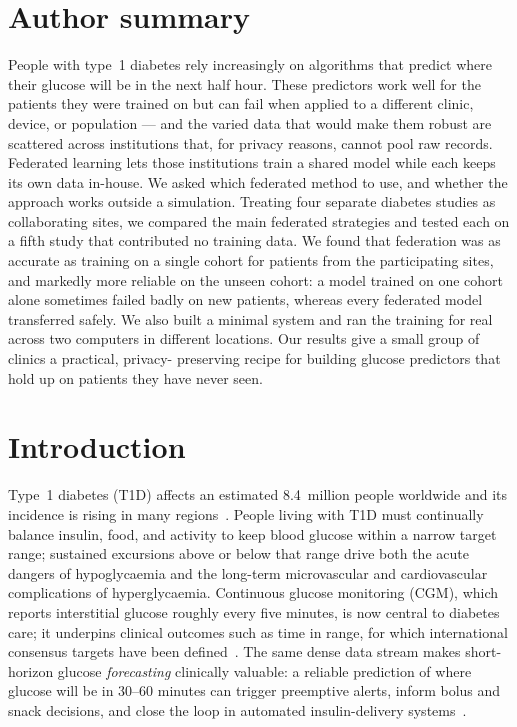 \documentclass[10pt,letterpaper]{article}
\begin{document}
\section*{Author summary}
People with type~1 diabetes rely increasingly on algorithms that predict where
their glucose will be in the next half hour. These predictors work well for the
patients they were trained on but can fail when applied to a different clinic,
device, or population --- and the varied data that would make them robust are
scattered across institutions that, for privacy reasons, cannot pool raw
records. Federated learning lets those institutions train a shared model while
each keeps its own data in-house. We asked which federated method to use, and
whether the approach works outside a simulation. Treating four separate
diabetes studies as collaborating sites, we compared the main federated
strategies and tested each on a fifth study that contributed no training data.
We found that federation was as accurate as training on a single cohort for
patients from the participating sites, and markedly more reliable on the unseen
cohort: a model trained on one cohort alone sometimes failed badly on new
patients, whereas every federated model transferred safely. We also built a
minimal system and ran the training for real across two computers in different
locations. Our results give a small group of clinics a practical, privacy-
preserving recipe for building glucose predictors that hold up on patients they
have never seen.

\clearpage
{}
\linenumbers

\section*{Introduction}

Type~1 diabetes (T1D) affects an estimated 8.4~million people worldwide and its
incidence is rising in many regions~\cite{idf2021,gregory2022t1dindex}. People living with T1D must
continually balance insulin, food, and activity to keep blood glucose within a
narrow target range; sustained excursions above or below that range drive both
the acute dangers of hypoglycaemia and the long-term microvascular and
cardiovascular complications of hyperglycaemia. Continuous glucose monitoring
(CGM), which reports interstitial glucose roughly every five minutes, is now
central to diabetes care; it underpins clinical outcomes such as time in range,
for which international consensus targets have been defined~\cite{battelino2019tir}. The same dense data stream makes
short-horizon glucose \emph{forecasting} clinically valuable: a reliable
prediction of where glucose will be in 30--60 minutes can trigger preemptive
alerts, inform bolus and snack decisions, and close the loop in automated
insulin-delivery systems~\cite{vettoretti2020advanced,bekiari2018ap}.
\end{document}
